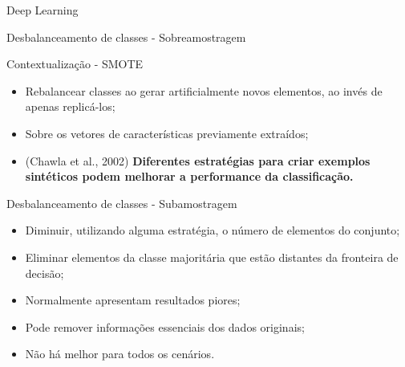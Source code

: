 \documentclass{beamer}
\begin{document}
\begin{frame}{Deep Learning}
\begin{frame}{Desbalanceamento de classes - Sobreamostragem}
\end{frame}
\begin{frame}{Contextualização - SMOTE}
\justifying
    \begin{itemize}
        \item Rebalancear classes ao gerar artificialmente novos elementos, ao invés de apenas replicá-los;
        \item Sobre os vetores de características previamente extraídos;
        \item (Chawla et al., 2002) \textbf{Diferentes estratégias para criar exemplos sintéticos podem melhorar a performance da classificação.}
    \end{itemize}
\end{frame}
\begin{frame}{Desbalanceamento de classes - Subamostragem}
    \begin{itemize}
        \item Diminuir, utilizando alguma estratégia, o número de elementos do conjunto;
        \item Eliminar elementos da classe majoritária que estão distantes da fronteira de decisão;
        \item Normalmente apresentam resultados piores;
        \item Pode remover informações essenciais dos dados originais;
        \item Não há melhor para todos os cenários.
    \end{itemize}


\end{frame}
\end{frame}
\end{document}
